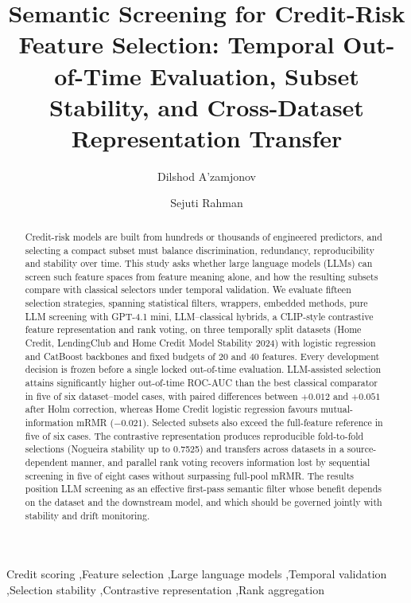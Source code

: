 \documentclass[preprint,12pt]{elsarticle}
\begin{document}
\begin{frontmatter}

\title{Semantic Screening for Credit-Risk Feature Selection: Temporal Out-of-Time Evaluation, Subset Stability, and Cross-Dataset Representation Transfer}

\author[aff1]{Dilshod A'zamjonov}

\author[aff2]{Sejuti Rahman}


\address[aff1]{Department of Engineering, New Uzbekistan University, 1 Movarounnahr Street, Mirzo Ulugbek District, Tashkent, Uzbekistan}
\address[aff2]{Department of Computing, New Uzbekistan University, 1 Movarounnahr Street, Mirzo Ulugbek District, Tashkent, Uzbekistan}

\begin{abstract}
Credit-risk models are built from hundreds or thousands of engineered predictors, and selecting a compact subset must balance discrimination, redundancy, reproducibility and stability over time. This study asks whether large language models (LLMs) can screen such feature spaces from feature meaning alone, and how the resulting subsets compare with classical selectors under temporal validation. We evaluate fifteen selection strategies, spanning statistical filters, wrappers, embedded methods, pure LLM screening with GPT-4.1 mini, LLM--classical hybrids, a CLIP-style contrastive feature representation and rank voting, on three temporally split datasets (Home Credit, LendingClub and Home Credit Model Stability 2024) with logistic regression and CatBoost backbones and fixed budgets of 20 and 40 features. Every development decision is frozen before a single locked out-of-time evaluation. LLM-assisted selection attains significantly higher out-of-time ROC-AUC than the best classical comparator in five of six dataset--model cases, with paired differences between $+0.012$ and $+0.051$ after Holm correction, whereas Home Credit logistic regression favours mutual-information mRMR ($-0.021$). Selected subsets also exceed the full-feature reference in five of six cases. The contrastive representation produces reproducible fold-to-fold selections (Nogueira stability up to 0.7525) and transfers across datasets in a source-dependent manner, and parallel rank voting recovers information lost by sequential screening in five of eight cases without surpassing full-pool mRMR. The results position LLM screening as an effective first-pass semantic filter whose benefit depends on the dataset and the downstream model, and which should be governed jointly with stability and drift monitoring.
\end{abstract}

\begin{keyword}
Credit scoring \sep Feature selection \sep Large language models \sep Temporal validation \sep Selection stability \sep Contrastive representation \sep Rank aggregation
\end{keyword}

\end{frontmatter}
\end{document}

